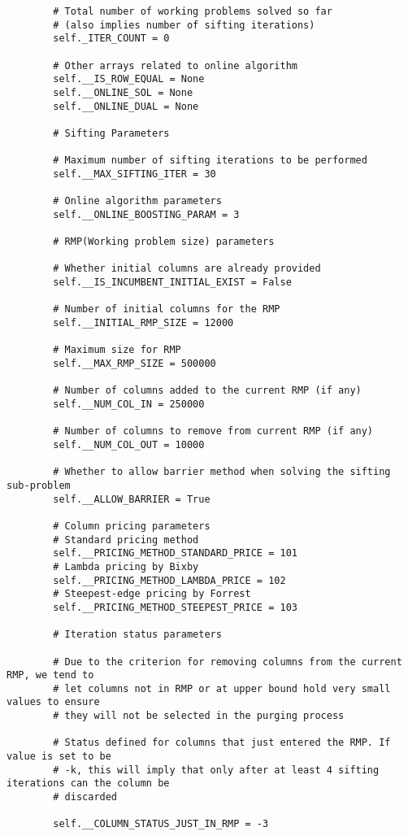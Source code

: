 \documentclass{article}
\begin{document}
\begin{lstlisting}
        # Total number of working problems solved so far 
        # (also implies number of sifting iterations)
        self._ITER_COUNT = 0

        # Other arrays related to online algorithm
        self.__IS_ROW_EQUAL = None
        self.__ONLINE_SOL = None
        self.__ONLINE_DUAL = None

        # Sifting Parameters

        # Maximum number of sifting iterations to be performed
        self.__MAX_SIFTING_ITER = 30

        # Online algorithm parameters
        self.__ONLINE_BOOSTING_PARAM = 3

        # RMP(Working problem size) parameters

        # Whether initial columns are already provided
        self.__IS_INCUMBENT_INITIAL_EXIST = False

        # Number of initial columns for the RMP
        self.__INITIAL_RMP_SIZE = 12000

        # Maximum size for RMP
        self.__MAX_RMP_SIZE = 500000

        # Number of columns added to the current RMP (if any)
        self.__NUM_COL_IN = 250000

        # Number of columns to remove from current RMP (if any)
        self.__NUM_COL_OUT = 10000

        # Whether to allow barrier method when solving the sifting sub-problem
        self.__ALLOW_BARRIER = True

        # Column pricing parameters
        # Standard pricing method
        self.__PRICING_METHOD_STANDARD_PRICE = 101
        # Lambda pricing by Bixby
        self.__PRICING_METHOD_LAMBDA_PRICE = 102
        # Steepest-edge pricing by Forrest
        self.__PRICING_METHOD_STEEPEST_PRICE = 103

        # Iteration status parameters

        # Due to the criterion for removing columns from the current RMP, we tend to 
        # let columns not in RMP or at upper bound hold very small values to ensure 
        # they will not be selected in the purging process

        # Status defined for columns that just entered the RMP. If value is set to be
        # -k, this will imply that only after at least 4 sifting iterations can the column be
        # discarded

        self.__COLUMN_STATUS_JUST_IN_RMP = -3


\end{lstlisting}
\end{document}

